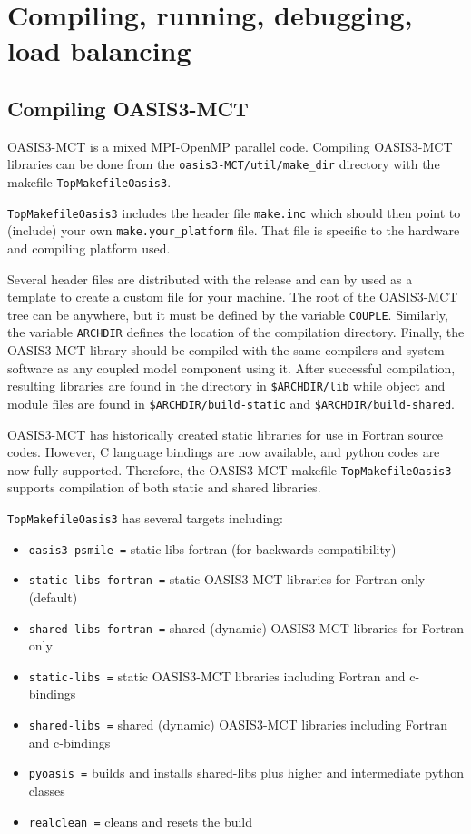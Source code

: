 \newpage
%

\chapter{Compiling, running, debugging, load balancing}
\label{sec_compilationrunning}

\section{Compiling OASIS3-MCT}
\label{subsec_compile}

OASIS3-MCT is a mixed MPI-OpenMP parallel code. Compiling OASIS3-MCT libraries can be done
from the {\tt oasis3-MCT/util/make\_dir} directory
with the makefile {\tt TopMakefileOasis3}.

{\tt TopMakefileOasis3} includes the header file {\tt make.inc}
which should then point to (include) your own {\tt make.your\_platform}
file.  That file is specific to the hardware and compiling platform used.

Several header files are distributed with the release and can by used as
a template to create a custom file for your machine.
The root of the OASIS3-MCT tree can be anywhere, but it must be defined
by the variable {\tt COUPLE}.  Similarly, the variable {\tt ARCHDIR} defines
the location of the compilation directory.
Finally, the OASIS3-MCT library
should be compiled with the same compilers and system software as any
coupled model component using it.  After successful compilation, resulting
libraries are found in the directory in {\tt \$ARCHDIR/lib} while
object and module files are found in {\tt \$ARCHDIR/build-static} and {\tt \$ARCHDIR/build-shared}. 

OASIS3-MCT has historically created static libraries for use in
Fortran source codes.  However, C language bindings are now
available, and python codes are now fully supported. Therefore, the OASIS3-MCT makefile {\tt TopMakefileOasis3}
supports compilation of both static and shared libraries.

{\tt TopMakefileOasis3} has several targets including:

\begin{itemize}
\item  {\tt oasis3-psmile       =} static-libs-fortran (for backwards compatibility)
\item  {\tt static-libs-fortran =} static OASIS3-MCT libraries for Fortran only (default)
\item  {\tt shared-libs-fortran =} shared (dynamic) OASIS3-MCT libraries for Fortran only
\item  {\tt static-libs         =} static OASIS3-MCT libraries including Fortran and c-bindings
\item  {\tt shared-libs         =} shared (dynamic) OASIS3-MCT libraries including Fortran and c-bindings
\item  {\tt pyoasis             =} builds and installs shared-libs plus higher and intermediate python classes
\item  {\tt realclean           =} cleans and resets the build
\end{itemize}

